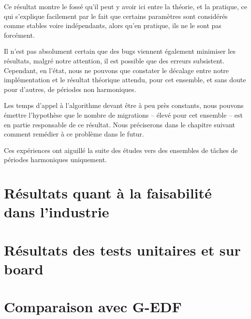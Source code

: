 	Ce résultat montre le fossé qu'il peut y avoir ici entre la théorie, et la pratique, ce qui 
	s'explique facilement par le fait que certains paramètres sont considérés comme stables 
	voire indépendants, alors qu'en pratique, ils ne le sont pas forcément. \newline
	
	Il n'est pas absolument certain que des bugs viennent également minimiser les résultats, malgré notre 
	attention, il est possible que des erreurs subsistent. Cependant, en l'état, nous ne pouvons que constater le décalage 
	entre notre implémentation et le résultat théorique attendu, pour cet ensemble, et sans doute pour d'autres, 
	de périodes non harmoniques.\newline
	
	
	
	
	Les temps d'appel à l'algorithme devant être à peu près constants, nous pouvons émettre l'hypothèse que le nombre 
	de migrations -- élevé pour cet ensemble -- est en partie responsable de ce résultat. Nous préciserons dans le chapitre suivant 
	comment remédier à ce problème dans le futur.\newline
	
	Ces expériences ont aiguillé la suite des études vers des ensembles de tâches de périodes harmoniques uniquement.

\section{Résultats quant à la faisabilité dans l'industrie}

	

\section{Résultats des tests unitaires et sur board}

	

\section{Comparaison avec G-EDF}

	